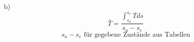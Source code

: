 b) \\
\[
\bar{T} = \frac{\int_{s_a}^{s_e} T ds}{s_a - s_e}
\]
\[
s_a - s_e \text{ für gegebene Zustände aus Tabellen}
\]
